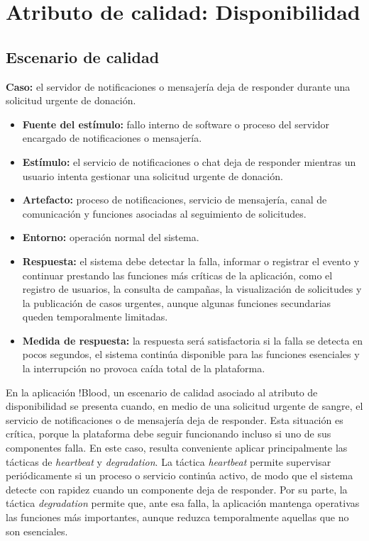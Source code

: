 \section{Atributo de calidad: Disponibilidad}

\subsection{Escenario de calidad}

\textbf{Caso:} el servidor de notificaciones o mensajería deja de responder durante una solicitud urgente de donación.

\begin{itemize}
    \item \textbf{Fuente del estímulo:} fallo interno de software o proceso del servidor encargado de notificaciones o mensajería.
    \item \textbf{Estímulo:} el servicio de notificaciones o chat deja de responder mientras un usuario intenta gestionar una solicitud urgente de donación.
    \item \textbf{Artefacto:} proceso de notificaciones, servicio de mensajería, canal de comunicación y funciones asociadas al seguimiento de solicitudes.
    \item \textbf{Entorno:} operación normal del sistema.
    \item \textbf{Respuesta:} el sistema debe detectar la falla, informar o registrar el evento y continuar prestando las funciones más críticas de la aplicación, como el registro de usuarios, la consulta de campañas, la visualización de solicitudes y la publicación de casos urgentes, aunque algunas funciones secundarias queden temporalmente limitadas.
    \item \textbf{Medida de respuesta:} la respuesta será satisfactoria si la falla se detecta en pocos segundos, el sistema continúa disponible para las funciones esenciales y la interrupción no provoca caída total de la plataforma.
\end{itemize}

En la aplicación !Blood, un escenario de calidad asociado al atributo de disponibilidad se presenta cuando, en medio de una solicitud urgente de sangre, el servicio de notificaciones o de mensajería deja de responder. Esta situación es crítica, porque la plataforma debe seguir funcionando incluso si uno de sus componentes falla. En este caso, resulta conveniente aplicar principalmente las tácticas de \textit{heartbeat} y \textit{degradation}. La táctica \textit{heartbeat} permite supervisar periódicamente si un proceso o servicio continúa activo, de modo que el sistema detecte con rapidez cuando un componente deja de responder. Por su parte, la táctica \textit{degradation} permite que, ante esa falla, la aplicación mantenga operativas las funciones más importantes, aunque reduzca temporalmente aquellas que no son esenciales.

